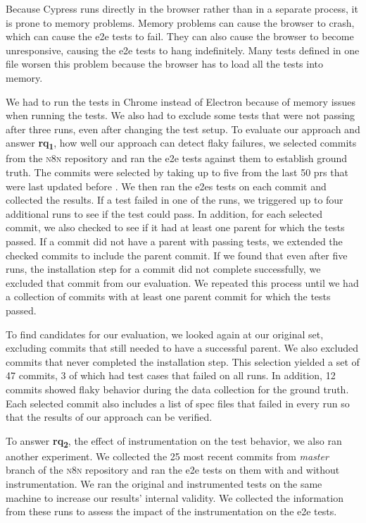 Because Cypress runs directly in the browser rather than in a separate process, it is prone to memory problems.
Memory problems can cause the browser to crash, which can cause the \ac{e2e} tests to fail.
They can also cause the browser to become unresponsive, causing the \ac{e2e} tests to hang indefinitely.
Many tests defined in one file worsen this problem because the browser has to load all the tests into memory.

We had to run the tests in Chrome instead of Electron because of memory issues when running the tests.
We also had to exclude some tests that were not passing after three runs, even after changing the test setup.
To evaluate our approach and answer \textbf{\acs{rq}\textsubscript{1}}, how well our approach can detect flaky failures, we selected commits from the \textsc{n8n} repository and ran the \ac{e2e} tests against them to establish ground truth.
The commits were selected by taking up to five from the last 50 \acp{pr} that were last updated before .
We then ran the \acp{e2e} tests on each commit and collected the results.
If a test failed in one of the runs, we triggered up to four additional runs to see if the test could pass.
In addition, for each selected commit, we also checked to see if it had at least one parent for which the tests passed.
If a commit did not have a parent with passing tests, we extended the checked commits to include the parent commit.
If we found that even after five runs, the installation step for a commit did not complete successfully, we excluded that commit from our evaluation.
We repeated this process until we had a collection of commits with at least one parent commit for which the tests passed.

To find candidates for our evaluation, we looked again at our original set, excluding commits that still needed to have a successful parent.
We also excluded commits that never completed the installation step.
This selection yielded a set of 47 commits, 3 of which had test cases that failed on all runs.
In addition, 12 commits showed flaky behavior during the data collection for the ground truth.
Each selected commit also includes a list of spec files that failed in every run so that the results of our approach can be verified.

To answer \textbf{\acs{rq}\textsubscript{2}}, the effect of instrumentation on the test behavior, we also ran another experiment.
We collected the 25 most recent commits from \textit{master} branch of the \textsc{n8n} repository and ran the \ac{e2e} tests on them with and without instrumentation.
We ran the original and instrumented tests on the same machine to increase our results' internal validity.
We collected the information from these runs to assess the impact of the instrumentation on the \ac{e2e} tests.

